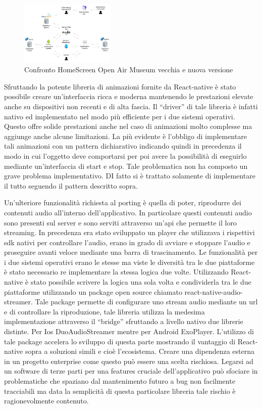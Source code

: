 \begin{figure}[h]
\includegraphics[width=0.4\textwidth]{images/SchemaOpenAirMuseum.png}
\caption{Confronto HomeScreen Open Air Museum vecchia e nuova versione}
\end{figure}
\vspace{5mm}
Sfruttando la potente libreria di animazioni fornite da React-native è stato possibile creare un'interfaccia ricca e moderna mantenendo le prestazioni elevate anche su dispositivi non recenti e di alta fascia. Il “driver” di tale libreria è infatti nativo ed implementato nel modo più efficiente per i due sistemi operativi. Questo offre solide prestazioni anche nel caso di animazioni molto complesse ma aggiunge anche alcune limitazioni. La più evidente è l’obbligo di implementare tali animazioni con un pattern dichiarativo indicando quindi in precedenza il modo in cui l’oggetto deve comportarsi per poi avere la possibilità di eseguirlo mediante un'interfaccia di start e stop. Tale problematica non ha composto un grave problema implementativo. DI fatto si è trattato solamente di implementare il tutto seguendo il pattern descritto sopra.\vspace{5mm}

Un'ulteriore funzionalità richiesta al porting è quella di poter, riprodurre dei contenuti audio all’interno dell’applicativo. In particolare questi contenuti audio sono presenti sul server e sono serviti attraverso un'api che permette il loro streaming. In precedenza era stato sviluppato un player che utilizzava i rispettivi sdk nativi per controllare l’audio, erano in grado di avviare e stoppare l’audio e proseguire avanti veloce mediante una barra di trascinamento. Le funzionalità per i due sistemi operativi erano le stesse ma viste le diversità tra le due piattaforme è stato necessario re implementare la stessa logica due volte. Utilizzando React-native è stato possibile scrivere la logica una sola volta e condividerla tra le due piattaforme utilizzando un package open source chiamato react-native-audio-streamer. Tale package permette di configurare uno stream audio mediante un url e di controllare la riproduzione, tale libreria utilizza la medesima implementazione attraverso il “bridge” sfruttando a livello nativo due librerie distinte. Per Ios DuoAudioStreamer mentre per Android ExoPlayer. L’utilizzo di tale package accelera lo sviluppo di questa parte mostrando il vantaggio di React-native sopra a soluzioni simili e cioè l’ecosistema. Creare una dipendenza esterna in un progetto enterprise come questo può essere una scelta rischiosa. Legarsi ad un software di terze parti per una features cruciale dell’applicativo può sfociare in problematiche che spaziano dal mantenimento futuro a bug non facilmente tracciabili ma data la semplicità di questa particolare libreria tale rischio è ragionevolmente contenuto.\vspace{5mm}

